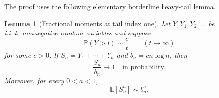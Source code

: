 \documentclass[11pt]{article}
\newtheorem{lemma}[theorem]{Lemma}
\newcommand{\E}{\mathbb E}
\newcommand{\Pp}{\mathbb P}
\begin{document}
The proof uses the following elementary borderline heavy-tail lemma.

\begin{lemma}[Fractional moments at tail index one]\label{lem:heavy}
Let $Y,Y_1,Y_2,\ldots$ be i.i.d.\ nonnegative random variables and suppose
\begin{equation}\label{eq:tail}
 \Pp(Y>t)\sim\frac{c}{t}
 \qquad(t\to\infty)
\end{equation}
for some $c>0$.  If $S_n=Y_1+\cdots+Y_n$ and
$b_n=cn\log n$, then
\[
 \frac{S_n}{b_n}\longrightarrow1
 \quad\text{in probability}.
\]
Moreover, for every $0<a<1$,
\begin{equation}\label{eq:fractional-sum}
 \E[S_n^a]\sim b_n^a.
\end{equation}
\end{lemma}
\end{document}
